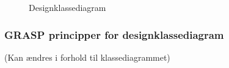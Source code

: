 \documentclass[../main.tex]{subfiles}
\begin{document}
\begin{flushleft}
\begin{figure}[H]
    \centering
    \caption{Designklassediagram\newline }
    
    \label{fig:designclass_diagram}
\end{figure}

\newpage 

\subsubsection{GRASP principper for designklassediagram}
\TODO (Kan ændres i forhold til klassediagrammet)


\end{flushleft}
\end{document}
